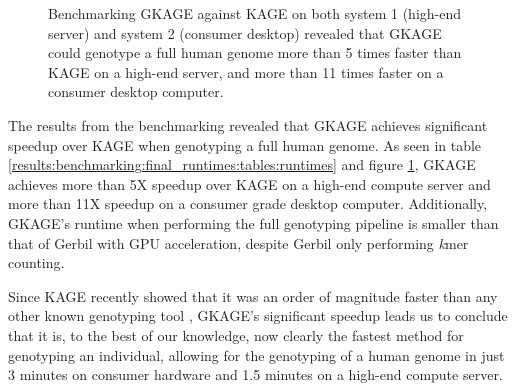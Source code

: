 \begin{figure}[H]
\begin{center}
\end{center}
\caption{
  Benchmarking GKAGE against KAGE on both system 1 (high-end server) and system 2 (consumer desktop) revealed that GKAGE could genotype a full human genome more than 5 times faster than KAGE on a high-end server, and more than 11 times faster on a consumer desktop computer.
}
\label{results:benchmarking:final_runtimes:figures:runtimes}
\end{figure}
%

The results from the benchmarking revealed that GKAGE achieves significant speedup over KAGE when genotyping a full human genome.
As seen in table \ref{results:benchmarking:final_runtimes:tables:runtimes} and figure \ref{results:benchmarking:final_runtimes:figures:runtimes}, GKAGE achieves more than 5X speedup over KAGE on a high-end compute server and more than 11X speedup on a consumer grade desktop computer.
Additionally, GKAGE's runtime when performing the full genotyping pipeline is smaller than that of Gerbil with GPU acceleration, despite Gerbil only performing \textit{k}mer counting.

Since KAGE recently showed that it was an order of magnitude faster than any other known genotyping tool \cite{kage}, GKAGE's significant speedup leads us to conclude that it is, to the best of our knowledge, now clearly the fastest method for genotyping an individual, allowing for the genotyping of a human genome in just 3 minutes on consumer hardware and 1.5 minutes on a high-end compute server.
